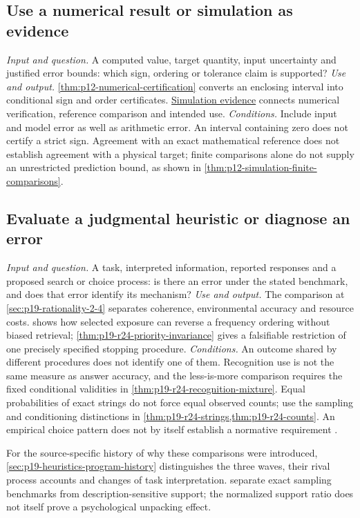 \subsection{Use a numerical result or simulation as evidence}
\label{sec:p14-finder-numerical}
\textit{Input and question.} A computed value, target quantity, input
uncertainty and justified error bounds: which sign, ordering or tolerance
claim is supported?
\textit{Use and output.}
\cref{thm:p12-numerical-certification} converts an enclosing interval into
conditional sign and order certificates.
\hyperref[sec:p12-simulation-results-as-evidence]{Simulation evidence}
connects numerical verification, reference comparison and intended use.
\textit{Conditions.} Include input and model error as well as arithmetic
error. An interval containing zero does not certify a strict sign. Agreement
with an exact mathematical reference does not establish agreement with a
physical target; finite comparisons alone do not supply an unrestricted
prediction bound, as shown in \cref{thm:p12-simulation-finite-comparisons}.

\subsection{Evaluate a judgmental heuristic or diagnose an error}
\label{sec:p14-finder-judgmental-heuristics}
\textit{Input and question.} A task, interpreted information, reported
responses and a proposed search or choice process: is there an error
under the stated benchmark, and does that error identify its mechanism?
\textit{Use and output.} The comparison at
\cref{sec:p19-rationality-2-4} separates coherence, environmental accuracy
and resource costs.  shows how selected exposure
can reverse a frequency ordering without biased retrieval;
\cref{thm:p19-r24-priority-invariance} gives a falsifiable restriction of
one precisely specified stopping procedure.
\textit{Conditions.} An outcome shared by different procedures does not
identify one of them. Recognition use is not the same measure as answer
accuracy, and the less-is-more comparison requires the fixed conditional
validities in \cref{thm:p19-r24-recognition-mixture}. Equal probabilities
of exact strings do not force equal observed counts; use the sampling
and conditioning distinctions in
\cref{thm:p19-r24-strings,thm:p19-r24-counts}. An empirical choice pattern
does not by itself establish a normative requirement
\cite{FiedlerPragerMcCaughey2021Heuristics}.

For the source-specific history of why these comparisons were introduced,
\cref{sec:p19-heuristics-program-history} distinguishes the three waves,
their rival process accounts and changes of task interpretation.
 separate exact sampling
benchmarks from description-sensitive support; the normalized support ratio
does not itself prove a psychological unpacking effect.

